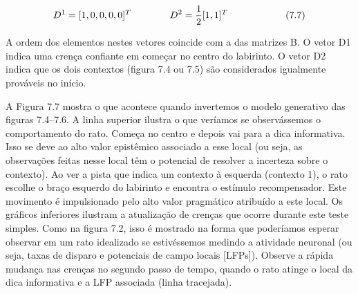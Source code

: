\documentclass[
  12pt,
]{book}
\begin{document}
\[ \begin{equation} 
D^1 = [1,0,0,0,0]^T \qquad\qquad\qquad\\ 
D^2 =\frac{1}{2}[1,1]^T
\end{equation} \qquad\qquad\qquad (7.7) \]

A ordem dos elementos nestes vetores coincide com a das matrizes B. O vetor D1 indica uma crença confiante em começar no centro do labirinto. O vetor D2 indica que os dois contextos (figura 7.4 ou 7.5) são considerados igualmente prováveis no início.

A Figura 7.7 mostra o que acontece quando invertemos o modelo generativo das figuras 7.4--7.6. A linha superior ilustra o que veríamos se observássemos o comportamento do rato. Começa no centro e depois vai para a dica informativa. Isso se deve ao alto valor epistêmico associado a esse local (ou seja, as observações feitas nesse local têm o potencial de resolver a incerteza sobre o contexto). Ao ver a pista que indica um contexto à esquerda (contexto 1), o rato escolhe o braço esquerdo do labirinto e encontra o estímulo recompensador. Este movimento é impulsionado pelo alto valor pragmático atribuído a este local. Os gráficos inferiores ilustram a atualização de crenças que ocorre durante este teste simples. Como na figura 7.2, isso é mostrado na forma que poderíamos esperar observar em um rato idealizado se estivéssemos medindo a atividade neuronal (ou seja, taxas de disparo e potenciais de campo locais {[}LFPs{]}). Observe a rápida mudança nas crenças no segundo passo de tempo, quando o rato atinge o local da dica informativa e a LFP associada (linha tracejada).
\end{document}
